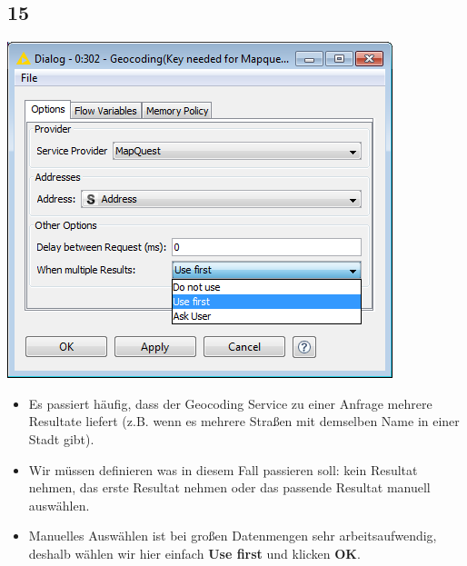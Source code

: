 \documentclass{beamer}
\begin{document}
\subsection{15}
\begin{frame}
	\begin{center}
  		\includegraphics[height=0.4\textheight]{15.png}
	\end{center}
	\begin{itemize}
		\item Es passiert häufig, dass der Geocoding Service zu einer Anfrage mehrere Resultate liefert (z.B. wenn es mehrere Straßen mit demselben Name in einer Stadt gibt).
		\item Wir müssen definieren was in diesem Fall passieren soll: kein Resultat nehmen, das erste Resultat nehmen oder das passende Resultat manuell auswählen.
		\item Manuelles Auswählen ist bei großen Datenmengen sehr arbeitsaufwendig, deshalb wählen wir hier einfach \textbf{Use first} und klicken \textbf{OK}.
	\end{itemize}
\end{frame}
\end{document}

